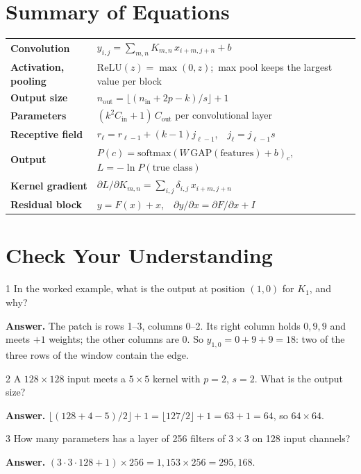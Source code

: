 \documentclass[11pt]{article}
\begin{document}
\section{Summary of Equations}
\begin{center}\small\renewcommand{\arraystretch}{1.6}
\begin{tabular}{ll}\toprule
\textbf{Convolution} & $y_{i,j}=\sum_{m,n}K_{m,n}\,x_{i+m,j+n}+b$\\
\textbf{Activation, pooling} & $\text{ReLU}(z)=\max(0,z)$;\ max pool keeps the largest value per block\\
\textbf{Output size} & $n_{\text{out}}=\lfloor(n_{\text{in}}+2p-k)/s\rfloor+1$\\
\textbf{Parameters} & $(k^2C_{\text{in}}+1)\,C_{\text{out}}$ per convolutional layer\\
\textbf{Receptive field} & $r_\ell=r_{\ell-1}+(k-1)j_{\ell-1}$,\ \ $j_\ell=j_{\ell-1}s$\\
\textbf{Output} & $P(c)=\text{softmax}(W\,\text{GAP}(\text{features})+b)_c$,\ \ $L=-\ln P(\text{true class})$\\
\textbf{Kernel gradient} & $\partial L/\partial K_{m,n}=\sum_{i,j}\delta_{i,j}\,x_{i+m,j+n}$\\
\textbf{Residual block} & $y=F(x)+x$,\ \ $\partial y/\partial x=\partial F/\partial x+I$\\\bottomrule
\end{tabular}\end{center}

\section{Check Your Understanding}
\begin{question}{1}
In the worked example, what is the output at position $(1,0)$ for $K_1$, and why?
\end{question}
\textbf{Answer.} The patch is rows 1--3, columns 0--2. Its right column holds $0,9,9$ and meets $+1$ weights; the other columns are 0. So $y_{1,0}=0+9+9=18$: two of the three rows of the window contain the edge.

\begin{question}{2}
A $128\times128$ input meets a $5\times5$ kernel with $p=2$, $s=2$. What is the output size?
\end{question}
\textbf{Answer.} $\lfloor(128+4-5)/2\rfloor+1=\lfloor127/2\rfloor+1=63+1=64$, so $64\times64$.

\begin{question}{3}
How many parameters has a layer of 256 filters of $3\times3$ on 128 input channels?
\end{question}
\textbf{Answer.} $(3\cdot3\cdot128+1)\times256=1{,}153\times256=295{,}168$.
\end{document}
